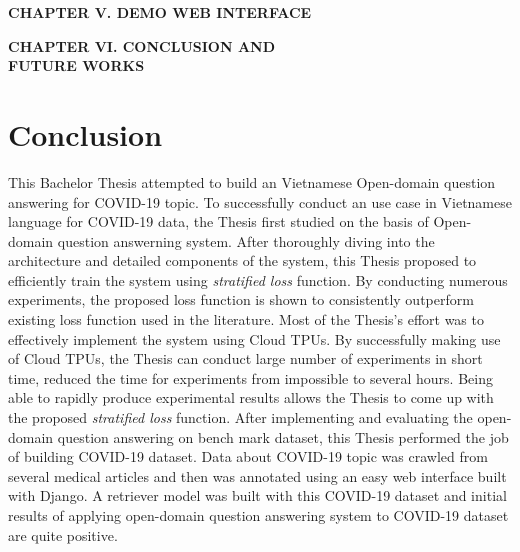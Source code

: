 \documentclass[3p, sort&compress, 12pt]{elsarticle}
\begin{document}
\clearpage
\newpage
\begin{center}
		\fontsize{20}{\baselineskip}\selectfont\sf\bfseries CHAPTER V. DEMO WEB INTERFACE
\end{center}
\label{chap:05}
\clearpage
\newpage
\begin{center}
	\fontsize{20}{\baselineskip}\selectfont\sf\bfseries CHAPTER VI. CONCLUSION AND \\[8pt]FUTURE WORKS
\end{center}
\label{chap:06}
\setcounter{section}{0}
\section{Conclusion}
This Bachelor Thesis attempted to build an Vietnamese Open-domain question answering for COVID-19 topic. To successfully conduct an use case in Vietnamese language for COVID-19 data, the Thesis first studied on the basis of Open-domain question answerning system. After thoroughly diving into the architecture and detailed components of the system, this Thesis proposed to efficiently train the system using \textit{stratified loss} function. By conducting numerous experiments, the proposed loss function is shown to consistently outperform existing loss function used in the literature. Most of the Thesis's effort was to effectively implement the system using Cloud TPUs. By successfully making use of Cloud TPUs, the Thesis can conduct large number of experiments in short time, reduced the time for experiments from impossible to several hours. Being able to rapidly produce experimental results allows the Thesis to come up with the proposed \textit{stratified loss} function. After implementing and evaluating the open-domain question answering on bench mark dataset, this Thesis performed the job of building COVID-19 dataset. Data about COVID-19 topic was crawled from several medical articles and then was annotated using an easy web interface built with Django. A retriever model was built with this COVID-19 dataset and initial results of applying open-domain question answering system to COVID-19 dataset are quite positive.
\end{document}
